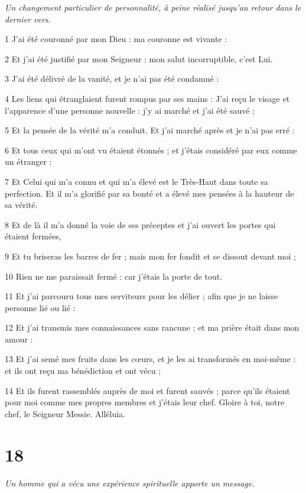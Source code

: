 \par \textit{Un changement particulier de personnalité, à peine réalisé jusqu'au retour dans le dernier vers.}

\par 1 J'ai été couronné par mon Dieu : ma couronne est vivante :
\par 2 Et j'ai été justifié par mon Seigneur : mon salut incorruptible, c'est Lui.
\par 3 J'ai été délivré de la vanité, et je n'ai pas été condamné :
\par 4 Les liens qui étranglaient furent rompus par ses mains : J'ai reçu le visage et l'apparence d'une personne nouvelle : j'y ai marché et j'ai été sauvé ;
\par 5 Et la pensée de la vérité m'a conduit. Et j'ai marché après et je n'ai pas erré :
\par 6 Et tous ceux qui m'ont vu étaient étonnés ; et j'étais considéré par eux comme un étranger :
\par 7 Et Celui qui m'a connu et qui m'a élevé est le Très-Haut dans toute sa perfection. Et il m'a glorifié par sa bonté et a élevé mes pensées à la hauteur de sa vérité.
\par 8 Et de là il m'a donné la voie de ses préceptes et j'ai ouvert les portes qui étaient fermées,
\par 9 Et tu briseras les barres de fer ; mais mon fer fondit et se dissout devant moi ;
\par 10 Rien ne me paraissait fermé : car j'étais la porte de tout.
\par 11 Et j'ai parcouru tous mes serviteurs pour les délier ; afin que je ne laisse personne lié ou lié :
\par 12 Et j'ai transmis mes connaissances sans rancune ; et ma prière était dans mon amour :
\par 13 Et j'ai semé mes fruits dans les cœurs, et je les ai transformés en moi-même : et ils ont reçu ma bénédiction et ont vécu ;
\par 14 Et ils furent rassemblés auprès de moi et furent sauvés ; parce qu'ils étaient pour moi comme mes propres membres et j'étais leur chef. Gloire à toi, notre chef, le Seigneur Messie. Alléluia.

\chapter{18}

\par \textit{Un homme qui a vécu une expérience spirituelle apporte un message.}

